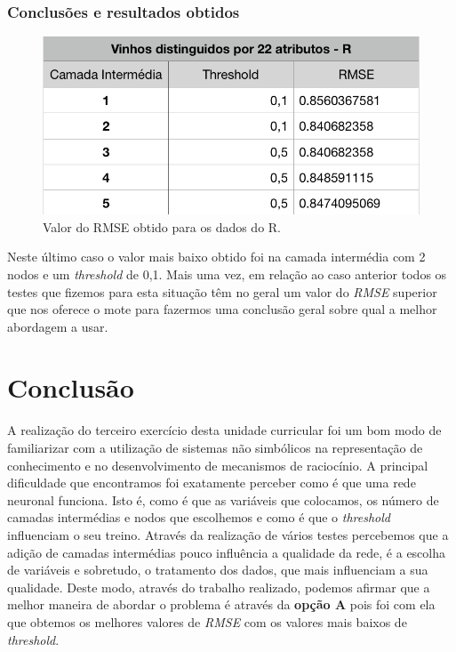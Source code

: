\documentclass{report}
\begin{document}
\subsection{Conclusões e resultados obtidos}


\begin{figure}[H]
\centering
\includegraphics[scale=0.5]{tabelas/7} 
\caption{Valor do RMSE obtido para os dados do R.}
\end{figure} 

\bigskip

Neste último caso o valor mais baixo obtido foi na camada intermédia com 2 nodos e um \textit{threshold} de 0,1. Mais uma vez, em relação ao caso anterior todos os testes que fizemos para esta situação têm no geral um valor do \textit{RMSE} superior que nos oferece o mote para fazermos uma conclusão geral sobre qual a melhor abordagem a usar.




\chapter{Conclusão} \label{concl}

A realização do terceiro exercício desta unidade curricular foi um bom modo de familiarizar com a utilização de sistemas não simbólicos na representação de conhecimento e no desenvolvimento de mecanismos de raciocínio.
A principal dificuldade que encontramos foi exatamente perceber como é que uma rede neuronal funciona. Isto é, como é que as variáveis que colocamos, os número de camadas intermédias e nodos que escolhemos e como é que o \textit{threshold} influenciam o seu treino.
Através da realização de vários testes percebemos que a adição de camadas intermédias pouco influência a qualidade da rede, é a escolha de variáveis e sobretudo, o tratamento dos dados, que mais influenciam a sua qualidade.
Deste modo, através do trabalho realizado, podemos afirmar que a melhor maneira de abordar o problema é através da \textbf{opção A} pois foi com ela que obtemos os melhores valores de \textit{RMSE} com os valores mais baixos de \textit{threshold}.
 


 
 
\end{document}
